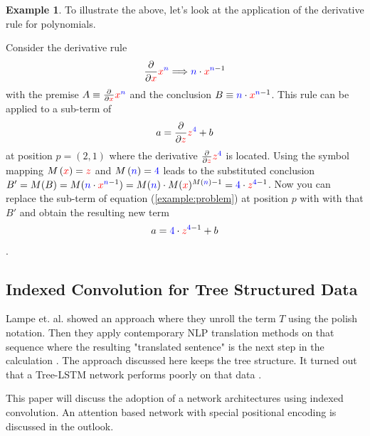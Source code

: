 \documentclass{scrartcl}
\theoremstyle{definition}
\newtheorem{exmp}{Example}[section]
\begin{document}
\begin{exmp}
To illustrate the above, let's look at the application of the derivative rule for polynomials.

Consider the derivative rule
\begin{align}
	\frac{\partial}{\partial {\color{red}x}} {\color{red}x}^{\color{blue}n} \Longrightarrow {\color{blue}n}\cdot {\color{red}x}^{{\color{blue}n}-1} 
\end{align}
with the premise $A\equiv \frac{\partial}{\partial {\color{red}x}} {\color{red}x}^{\color{blue}n}$ and the conclusion $B\equiv {\color{blue}n}\cdot {\color{red}x}^{{\color{blue}n}-1}$.
This rule can be applied to a sub-term of
\begin{align}
	a = \frac{\partial}{\partial {\color{red}z}} {\color{red}z}^{\color{blue}4} + b
	\label{example:problem}
\end{align}
at position $p=\left(2,1\right)$ where the derivative $\frac{\partial}{\partial {\color{red}z}} {\color{red}z}^{\color{blue}4}$ is located.
Using the symbol mapping $M\left({\color{red}x}\right) = \color{red}z$ and $M\left({\color{blue}n} \right) = {\color{blue}4}$ leads to the substituted conclusion
$B' = M(B) = M({\color{blue}n}\cdot {\color{red}x}^{{\color{blue}n}-1}) = {M(\color{blue}n})\cdot M({\color{red}x})^{M({\color{blue}n})-1} = {\color{blue}4}\cdot {\color{red}z}^{{\color{blue}4}-1}$.
Now you can replace the sub-term of equation (\ref{example:problem}) at position $p$ with with that $B'$ and obtain the resulting new term
\begin{align}
	a = {\color{blue}4}\cdot {\color{red}z}^{{\color{blue}4}-1} + b
\end{align}.

\end{exmp}

\subsection{Indexed Convolution for Tree Structured Data}

Lampe et. al. showed an approach where they unroll the term $T$ using the polish notation.
Then they apply contemporary NLP translation methods on that sequence where the resulting "translated sentence" is the next step in the calculation \cite{Lample2020Deep}.
The approach discussed here keeps the tree structure.
It turned out that a Tree-LSTM network performs poorly on that data \cite{tai2015improved}.

This paper will discuss the adoption of a network architectures using indexed convolution.
An attention based network with special positional encoding is discussed in the outlook. 
\end{document}
